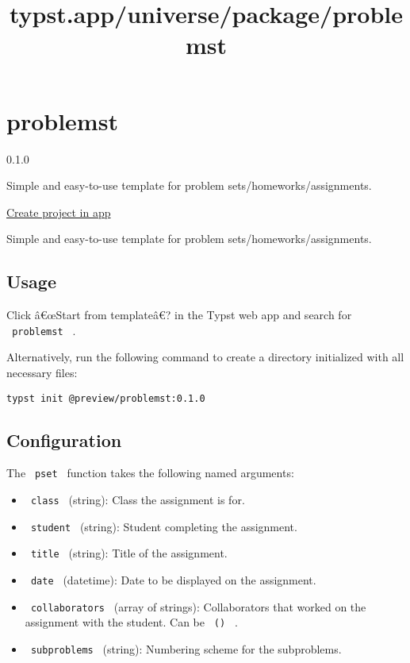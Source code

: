 \title{typst.app/universe/package/problemst}

\label{banner}
\label{template-thumbnail}

\section{problemst}\label{problemst}

{ 0.1.0 }

Simple and easy-to-use template for problem sets/homeworks/assignments.

\href{/app?template=problemst&version=0.1.0}{Create project in app}

\label{readme}
Simple and easy-to-use template for problem sets/homeworks/assignments.


\subsection{Usage}\label{usage}

Click â€œStart from templateâ€? in the Typst web app and search for
\texttt{\ problemst\ } .

Alternatively, run the following command to create a directory
initialized with all necessary files:

\begin{verbatim}
typst init @preview/problemst:0.1.0
\end{verbatim}

\subsection{Configuration}\label{configuration}

The \texttt{\ pset\ } function takes the following named arguments:

\begin{itemize}
\tightlist
\item
  \texttt{\ class\ } (string): Class the assignment is for.
\item
  \texttt{\ student\ } (string): Student completing the assignment.
\item
  \texttt{\ title\ } (string): Title of the assignment.
\item
  \texttt{\ date\ } (datetime): Date to be displayed on the assignment.
\item
  \texttt{\ collaborators\ } (array of strings): Collaborators that
  worked on the assignment with the student. Can be \texttt{\ ()\ } .
\item
  \texttt{\ subproblems\ } (string): Numbering scheme for the
  subproblems.
\end{itemize}

